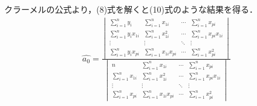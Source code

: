 \documentclass[dvipdfmx]{jsarticle}
\begin{document}
クラーメルの公式より，(8)式を解くと(10)式のような結果を得る．
\begin{equation}
  \begin{array}{c}
    \hat{a_0} =
    \frac{
      \begin{vmatrix}
        \displaystyle
        \sum_{i=1}^n y_i          &
        \displaystyle
        \sum_{i=1}^n x_{1i}       &
        \displaystyle
        \cdots                    &
        \displaystyle
        \sum_{i=1}^n x_{pi}         \\
        \displaystyle
        \sum_{i=1}^n y_ix_{1i}    &
        \displaystyle
        \sum_{i=1}^n x_{1i}^2     &
        \displaystyle
        \cdots                    &
        \displaystyle
        \sum_{i=1}^n x_{pi}x_{1i}   \\
        \vdots                    &
        \vdots                    &
        \ddots                    &
        \vdots                      \\
        \displaystyle
        \sum_{i=1}^n y_ix_{pi}    &
        \displaystyle
        \sum_{i=1}^n x_{1i}x_{pi} &
        \displaystyle
        \cdots                    &
        \displaystyle
        \sum_{i=1}^n x_{pi}^2
      \end{vmatrix}
    }{
      \begin{vmatrix}
        \displaystyle
        n                         &
        \displaystyle
        \sum_{i=1}^n x_{1i}       &
        \displaystyle
        \cdots                    &
        \displaystyle
        \sum_{i=1}^n x_{pi}         \\
        \displaystyle
        \sum_{i=1}^n x_{1i}       &
        \displaystyle
        \sum_{i=1}^n x_{1i}^2     &
        \displaystyle
        \cdots                    &
        \displaystyle
        \sum_{i=1}^n x_{pi}x_{1i}   \\
        \vdots                    &
        \vdots                    &
        \ddots                    &
        \vdots                      \\
        \displaystyle
        \sum_{i=1}^n x_{pi}       &
        \displaystyle
        \sum_{i=1}^n x_{1i}x_{pi} &
        \displaystyle
        \cdots                    &
        \displaystyle
        \sum_{i=1}^n x_{pi}^2
      \end{vmatrix}
    }

    \\
    \\


\end{array}
\end{equation}
\end{document}
